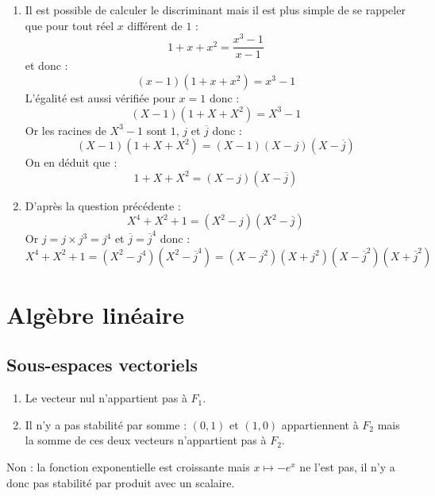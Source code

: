 \documentclass[a4paper,twoside,french,11pt]{VcCours}
\begin{document}
\begin{enumerate}
\item Il est possible de calculer le discriminant mais il est plus simple de se rappeler que pour tout réel $x$ différent de $1$ :
$$ 1+x+x^2 = \dfrac{x^3-1}{x-1}$$
et donc :
$$ (x-1)(1+x+x^2)= x^3-1$$
L'égalité est aussi vérifiée pour $x=1$ donc :
$$ (X-1)(1+X+X^2)= X^3-1$$
Or les racines de $X^3-1$ sont $1$, $j$ et $\overline{j}$ donc :
$$ (X-1)(1+X+X^2)=(X-1)(X-j)(X- \overline{j})$$
On en déduit que :
$$ 1+X+X^2 = (X-j)(X- \overline{j})$$
\item D'après la question précédente :
$$ X^4+X^2+1 = (X^2-j)(X^2-\overline{j})$$
Or $j=j \times j^3 = j^4$ et $\overline{j}= \overline{j}^4$ donc :
$$ X^4+X^2+1 = (X^2-j^4)(X^2-\overline{j}^4)= (X-j^2)(X+j^2)(X-\overline{j}^2) (X+\overline{j}^2)$$
\end{enumerate}







\section{Algèbre linéaire}

\subsection{Sous-espaces vectoriels}

\begin{Exercice}{}\end{Exercice}

\begin{enumerate}
\item Le vecteur nul n'appartient pas à $F_1$.
\item Il n'y a pas stabilité par somme : $(0,1)$ et $(1,0)$ appartiennent à $F_2$ mais la somme de ces deux vecteurs n'appartient pas à $F_2$.
\end{enumerate}



\begin{Exercice}{}\end{Exercice}Non : la fonction exponentielle est croissante mais $x \mapsto -e^x$ ne l'est pas, il n'y a donc pas stabilité par produit avec un scalaire.



\begin{Exercice}{}\end{Exercice}
\end{document}

